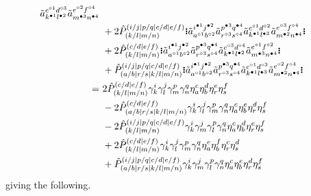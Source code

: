 \documentclass[11pt,fleqn]{article}
\newcommand{\g}{\gamma}      %
\newcommand{\h}{\eta}        %
\newcommand{\tl}{\ensuremath{\tilde}}
\newcommand{\op}[1]{\ensuremath{\hat{#1}}}
\newcommand{\GNO}[1]{\setstackgap{S}{0.7pt}\ensuremath{\Shortstack{\textbf{.} \textbf{.} \textbf{.}}#1\Shortstack{\textbf{.} \textbf{.} \textbf{.}}}}
\theoremstyle{mystyle}
\newcommand{\hole}{\circ}
\newcommand{\ptcl}{\bullet}
\begin{document}
\begin{align*}
{    \tl{a}_{k^{\ptcl1}l^{\ptcl2}}^{c^{\hole1}d^{\hole3}}
    \tl{a}_{m^{\ptcl3}n^{\ptcl4}}^{e^{\hole2}f^{\hole4}}
  }
\\&\
+
  2
  \op{P}_{(k/l|m/n)}^{(i/j|p/q|c/d|e/f)}
  \GNO{
    \tl{a}_{a^{\hole1}b^{\hole2}}^{i^{\ptcl1}j^{\ptcl2}}
    \tl{a}_{r^{\hole3}s^{\hole4}}^{p^{\ptcl3}q^{\ptcl4}}
    \tl{a}_{k^{\ptcl1}l^{\ptcl3}}^{c^{\hole1}d^{\hole2}}
    \tl{a}_{m^{\ptcl2}n^{\ptcl4}}^{e^{\hole3}f^{\hole4}}
  }
\\&\
+
  2
  \op{P}_{(k/l|m/n)}^{(c/d|e/f)}
  \GNO{
    \tl{a}_{a^{\hole1}b^{\hole2}}^{i^{\ptcl1}j^{\ptcl2}}
    \tl{a}_{r^{\hole3}s^{\hole4}}^{p^{\ptcl3}q^{\ptcl4}}
    \tl{a}_{k^{\ptcl1}l^{\ptcl2}}^{c^{\hole3}d^{\hole4}}
    \tl{a}_{m^{\ptcl3}n^{\ptcl4}}^{e^{\hole1}f^{\hole2}}
  }
\\&\
+
  \op{P}_{(a/b|r/s|k/l|m/n)}^{(i/j|p/q|c/d|e/f)}
  \GNO{
    \tl{a}_{a^{\hole1}b^{\hole2}}^{i^{\ptcl1}j^{\ptcl2}}
    \tl{a}_{r^{\hole3}s^{\hole4}}^{p^{\ptcl3}q^{\ptcl4}}
    \tl{a}_{k^{\ptcl1}l^{\ptcl3}}^{c^{\hole1}d^{\hole3}}
    \tl{a}_{m^{\ptcl2}n^{\ptcl4}}^{e^{\hole2}f^{\hole4}}
  }
\\=&\
  2
  \op{P}_{(k/l|m/n)}^{(c/d|e/f)}
  \g_k^i\g_l^j\g_m^p\g_n^q
  \h_a^c\h_b^d\h_r^e\h_s^f
\\&\
-
  2
  \op{P}_{(a/b|r/s|k/l|m/n)}^{(c/d|e/f)}
  \g_k^i\g_l^j\g_m^p\g_n^q
  \h_a^c\h_b^e\h_r^d\h_s^f
\\&\
-
  2
  \op{P}_{(k/l|m/n)}^{(i/j|p/q|c/d|e/f)}
  \g_k^i\g_m^j\g_l^p\g_n^q
  \h_a^c\h_b^d\h_r^e\h_s^f
\\&\
+
  2
  \op{P}_{(k/l|m/n)}^{(c/d|e/f)}
  \g_k^i\g_l^j\g_m^p\g_n^q
  \h_a^e\h_b^f\h_r^c\h_s^d
\\&\
+
  \op{P}_{(a/b|r/s|k/l|m/n)}^{(i/j|p/q|c/d|e/f)}
  \g_k^i\g_m^j\g_l^p\g_n^q
  \h_a^c\h_b^e\h_r^d\h_s^f
\end{align*}
giving the following.
\end{document}
